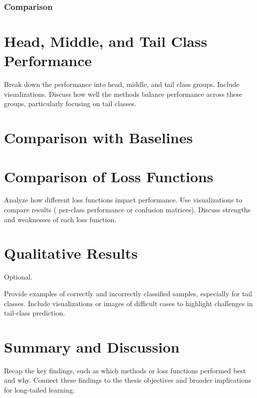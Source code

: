 \subsubsection{Comparison}


\section{Head, Middle, and Tail Class Performance}
Break down the performance into head, middle, and tail class groups.
Include visualizations.
Discuss how well the methods balance performance across these groups, particularly focusing on tail classes.


\section{Comparison with Baselines}

\section{Comparison of Loss Functions}
Analyze how different loss functions impact performance.
Use visualizations to compare results ( per-class performance or confusion matrices).
Discuss strengths and weaknesses of each loss function.

\section{Qualitative Results}
Optional.

Provide examples of correctly and incorrectly classified samples, especially for tail classes.
Include visualizations or images of difficult cases to highlight challenges in tail-class prediction.



\section{Summary and Discussion}
Recap the key findings, such as which methods or loss functions performed best and why.
Connect these findings to the thesis objectives and broader implications for long-tailed learning.